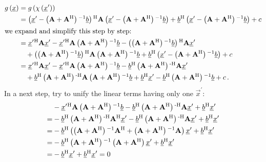 \documentclass[a4paper,10pt]{article}
\begin{document}
\begin{equation*}
\begin{split}
  g\left(\vec{x}\right)
  & =g\left(\chi\left(\vec{x}^{\prime}\right)\right) \\
  & = \left(\vec{x}^{\prime} - \left(\mat{A} + \mat{A}\H\right)\inv \vec{b}\right)\H
      \mat{A}
      \left(\vec{x}^{\prime} - \left(\mat{A} + \mat{A}\H\right)\inv \vec{b}\right)
      + \vec{b}\H \left(\vec{x}^{\prime} - \left(\mat{A} + \mat{A}\H\right)\inv \vec{b}\right)
      + c \\
\intertext{we expand and simplify this step by step:}
  & =   \vec{x}^{\prime}\H \mat{A} \vec{x}^{\prime}
      - \vec{x}^{\prime}\H \mat{A} \left(\mat{A} + \mat{A}\H\right)\inv \vec{b}
      - \left(\left(\mat{A} + \mat{A}\H\right)\inv \vec{b}\right)\H \mat{A} \vec{x}^{\prime} \\
  & \quad
      + \left(\left(\mat{A} + \mat{A}\H\right)\inv \vec{b}\right)\H \mat{A} \left(\mat{A} + \mat{A}\H\right)\inv \vec{b}
      + \vec{b}\H \left(\vec{x}^{\prime} - \left(\mat{A} + \mat{A}\H\right)\inv \vec{b}\right)
      + c \\
  & =   \vec{x}^{\prime}\H \mat{A} \vec{x}^{\prime}
      - \vec{x}^{\prime}\H \mat{A} \left(\mat{A} + \mat{A}\H\right)\inv \vec{b}
      - \vec{b}\H \left(\mat{A} + \mat{A}\H\right)\Hinv \mat{A} \vec{x}^{\prime} \\
  & \quad
      + \vec{b}\H \left(\mat{A} + \mat{A}\H\right)\Hinv \mat{A} \left(\mat{A} + \mat{A}\H\right)\inv \vec{b}
      + \vec{b}\H \vec{x}^{\prime} - \vec{b}\H \left(\mat{A} + \mat{A}\H\right)\inv \vec{b}
      + c \,.
\end{split}
\end{equation*}
In a next step, try to unify the linear terms having only one $\vec{x}^{\prime}$:
\begin{equation*}
\begin{split}
   &- \vec{x}^{\prime}\H \mat{A} \left(\mat{A} + \mat{A}\H\right)\inv \vec{b}
    - \vec{b}\H \left(\mat{A} + \mat{A}\H\right)\Hinv \mat{A} \vec{x}^{\prime}
    + \vec{b}\H \vec{x}^{\prime} \\
 = &- \vec{b}\H \left(\mat{A} + \mat{A}\H\right)\Hinv \mat{A}\H \vec{x}^{\prime}
    - \vec{b}\H \left(\mat{A} + \mat{A}\H\right)\Hinv \mat{A} \vec{x}^{\prime}
    + \vec{b}\H \vec{x}^{\prime} \\
 = &- \vec{b}\H
      \left(
        \left(\mat{A} + \mat{A}\H\right)\inv \mat{A}\H
      + \left(\mat{A} + \mat{A}\H\right)\inv \mat{A}
      \right)
      \vec{x}^{\prime}
    + \vec{b}\H \vec{x}^{\prime} \\
 = &- \vec{b}\H
      \left(\mat{A} + \mat{A}\H\right)\inv
      \left(\mat{A} + \mat{A}\H\right)
      \vec{x}^{\prime}
    + \vec{b}\H \vec{x}^{\prime} \\
 = &- \vec{b}\H \vec{x}^{\prime}
    + \vec{b}\H \vec{x}^{\prime} = 0
\end{split}
\end{equation*}
\end{document}
